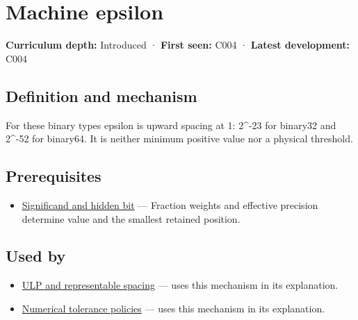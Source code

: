 \hypertarget{appendix-390ea641da54}{}\label{referencestart:appendix-390ea641da54}
\section{Machine epsilon}\label{appendix-390ea641da54-machine-epsilon}

\hypertarget{appendix-390ea641da54-machine-epsilon}{}

\textbf{Curriculum depth:} Introduced · \textbf{First seen:} C004 · \textbf{Latest development:} C004

\begin{allmightroledefinition}

\subsection{Definition and mechanism}\label{appendix-390ea641da54-definition-and-mechanism}

\hypertarget{appendix-390ea641da54-definition-and-mechanism}{}

For these binary types epsilon is upward spacing at 1: 2\^{}-23 for binary32 and 2\^{}-52 for binary64. It is neither minimum positive value nor a physical threshold.

\end{allmightroledefinition}

\subsection{Prerequisites}\label{appendix-390ea641da54-prerequisites}

\hypertarget{appendix-390ea641da54-prerequisites}{}

\begin{itemize}
\tightlist
\item
  \hyperref[appendix-a24fd710cf67]{Significand and hidden bit} --- Fraction weights and effective precision determine value and the smallest retained position.
\end{itemize}

\subsection{Used by}\label{appendix-390ea641da54-used-by}

\hypertarget{appendix-390ea641da54-used-by}{}

\begin{itemize}
\tightlist
\item
  \hyperref[appendix-14bab4cab9d4]{ULP and representable spacing} --- uses this mechanism in its explanation.
\item
  \hyperref[appendix-0ec599f8ba27]{Numerical tolerance policies} --- uses this mechanism in its explanation.
\end{itemize}

